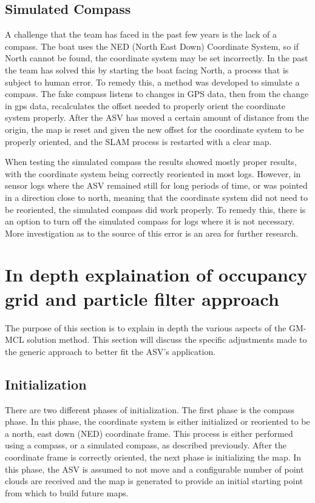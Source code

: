 \documentclass[10pt]{IEEEtran}
\begin{document}
\subsection{Simulated Compass}
A challenge that the team has faced in the past few years is the lack of a compass.  
The boat uses the NED (North East Down) Coordinate System, so if North cannot be found, 
the coordinate system may be set incorrectly.  In the past the team has solved this by
starting the boat facing North, a process that is subject to human error. To remedy this,
a method was developed to simulate a compass.  The fake compass listens to changes in GPS
data, then from the change in gps data, recalculates the offset needed to 
properly orient the coordinate system properly.  After the ASV has moved a certain amount
of distance from the origin, the map is reset and given the new offset for the coordinate
system to be properly oriented, and the SLAM process is restarted with a clear map.

When testing the simulated compass the results showed mostly proper results, with the 
coordinate system being correctly reoriented in most logs.  However, in sensor logs where 
the ASV remained still for long periods of time, or was pointed in a direction close to 
north, meaning that the coordinate system did not need to be reoriented, the simulated
compass did work properly.  To remedy this, there is an option to turn off the simulated
compass for logs where it is not necessary.  More investigation as to the source of this
error is an area for further research.

\section{In depth explaination of occupancy grid and particle filter approach}
The purpose of this section is to explain in depth the various aspects of the GM-MCL
solution method.  This section will discuss the specific adjustments made to the generic
approach to better fit the ASV's application.

\subsection{Initialization}
There are two different phases of initialization.  The first phase is the compass phase.
In this phase, the coordinate system is either initialized or reoriented to be a north, east
down (NED) coordinate frame.  This process is either performed using a compass, or
a simulated compass, as described previously.  After the coordinate frame is correctly
oriented, the next phase is initializing the map.  In this phase, the ASV is assumed to not
move and a configurable number of point clouds are received and the map is generated to
provide an initial starting point from which to build future maps.
\end{document}
